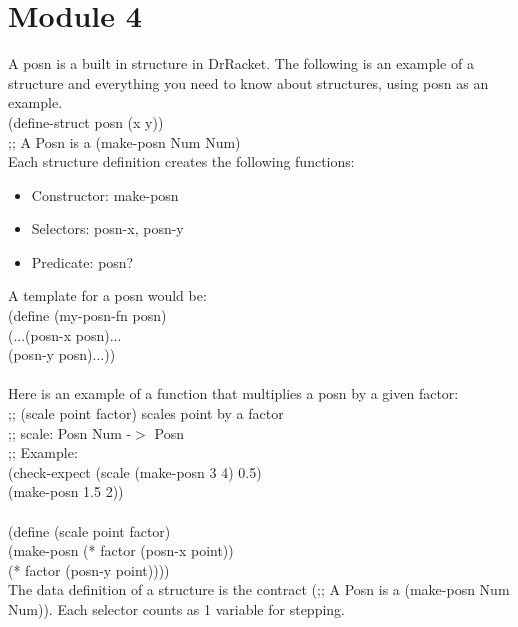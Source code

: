 \documentclass[12pt,letter]{article}
\begin{document}
\section*{Module 4}
A posn is a built in structure in DrRacket. The following is an example of a structure and everything you need to know about structures, using posn as an example. \\ 
(define-struct posn (x y))\\
;; A Posn is a (make-posn Num Num)\\ 
Each structure definition creates the following functions: 
\begin{itemize}
    \item Constructor: make-posn
    \item Selectors: posn-x, posn-y
    \item Predicate: posn?
\end{itemize}
A template for a posn would be: \\ 
(define (my-posn-fn posn)\\ 
\indent(...(posn-x posn)...\\
\indent\indent(posn-y posn)...))\\\\
Here is an example of a function that multiplies a posn by a given factor: \\ 
;; (scale point factor) scales point by a factor\\ 
;; scale: Posn Num -$>$ Posn \\ 
;; Example:\\ 
(check-expect (scale (make-posn 3 4) 0.5)\\ 
\indent\indent\indent\indent\indent\:\:\:\:\:\: (make-posn 1.5 2))\\\\
(define (scale point factor)\\
\indent(make-posn (* factor (posn-x point))\\
\indent\indent\indent\indent\:\:\:\:(* factor (posn-y point))))\\

The data definition of a structure is the contract (;; A Posn is a (make-posn Num Num)). Each selector counts as 1 variable for stepping. \\ 
\end{document}
